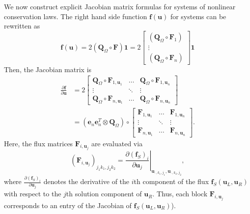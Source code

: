 \documentclass{article}
\newcommand{\pd}[2]{\frac{\partial#1}{\partial#2}}
\newcommand{\LRp}[1]{\left( #1 \right)}
\newcommand{\LRl}[1]{\left. #1 \right|}
\newcommand{\eqlab}[1]{\begin{align}#1\end{align}}
\newcommand{\bmat}[1]{\begin{bmatrix}#1\end{bmatrix}}
\begin{document}
We now construct explicit Jacobian matrix formulas for systems of nonlinear conservation laws.  The right hand side function $\bm{f}(\bm{u})$ for systems can be rewritten as
\[
\bm{f}(\bm{u}) = 2\LRp{ \bm{Q}_{\Omega} \circ \bm{F}}\bm{1} 
= 2\bmat{(\bm{Q}_{\Omega}\circ \bm{F}_1) \\ 
\vdots\\
(\bm{Q}_{\Omega}\circ \bm{F}_n)
}\bm{1}
\]
Then, the Jacobian matrix is 
\eqlab{
\pd{\bm{f}}{\bm{u}} &= 2\bmat{
\bm{Q}_{\Omega}\circ \bm{F}_{1,\bm{u}_1} & \ldots & \bm{Q}_{\Omega}\circ \bm{F}_{1,\bm{u}_n}\\ 
\vdots & \ddots & \vdots\\
\bm{Q}_{\Omega}\circ \bm{F}_{n,\bm{u}_1} & \ldots & \bm{Q}_{\Omega}\circ \bm{F}_{n,\bm{u}_n}
} \label{eq:fluxjac}\\
&= \LRp{\bm{e}_n\bm{e}_n^T\otimes \bm{Q}_{\Omega}} \circ 
\bmat{
\bm{F}_{1,\bm{u}_1} & \ldots &\bm{F}_{1,\bm{u}_{n}}\\
\vdots & \ddots & \vdots \\
\bm{F}_{n,\bm{u}_1} & \ldots &\bm{F}_{n,\bm{u}_n}\nonumber
}.
}
Here, the flux matrices $\bm{F}_{i,\bm{u}_j}$ are evaluated via
\[
\LRp{\bm{F}_{i,\bm{u}_j}}_{j_1k_1,j_2k_2} = \LRl{\pd{\LRp{\bm{f}_S}_i}{\bm{u}_j}}_{\bm{u}_{:,k_1,j_1},\bm{u}_{:,k_2,j_2}},
\]
where $\pd{\LRp{\bm{f}_S}_i}{\bm{u}_{j}}$ denotes the derivative of the $i$th component of the flux $\bm{f}_S\LRp{\bm{u}_L,\bm{u}_R}$ with respect to the $j$th solution component of $\bm{u}_R$.  Thus, each block $\bm{F}_{i,\bm{u}_j}$ corresponds to an entry of the Jacobian of $\bm{f}_S(\bm{u}_L,\bm{u}_R)$).
\end{document}
